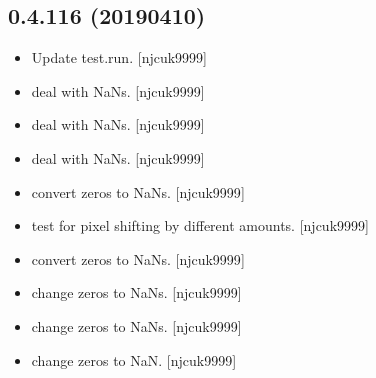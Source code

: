 \documentclass[a4paper,10pt,english]{report}
\begin{document}
\subsection{0.4.116 (2019\sphinxhyphen{}04\sphinxhyphen{}10)}
\label{\detokenize{misc/changelog:id164}}\begin{itemize}
\item {} 
Update test.run. {[}njcuk9999{]}

\item {} 
 \sphinxhyphen{} deal with NaNs. {[}njcuk9999{]}

\item {} 
 \sphinxhyphen{} deal with NaNs. {[}njcuk9999{]}

\item {} 
 \sphinxhyphen{} deal with NaNs. {[}njcuk9999{]}

\item {} 
 \sphinxhyphen{} convert zeros to NaNs. {[}njcuk9999{]}

\item {} 
 \sphinxhyphen{} test for pixel shifting by different amounts.
{[}njcuk9999{]}

\item {} 
 \sphinxhyphen{} convert zeros to NaNs. {[}njcuk9999{]}

\item {} 
 \sphinxhyphen{} change zeros to NaNs. {[}njcuk9999{]}

\item {} 
 \sphinxhyphen{} change zeros to NaNs. {[}njcuk9999{]}

\item {} 
 \sphinxhyphen{} change zeros to NaN. {[}njcuk9999{]}

\end{itemize}
\end{document}
